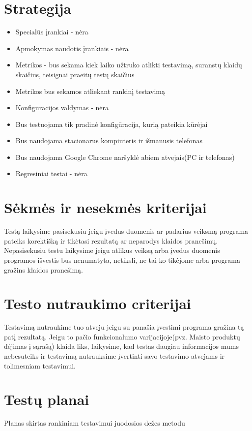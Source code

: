 \documentclass[oneside]{VUMIFPSkursinis}
\begin{document}
\section{Strategija}
	\begin{itemize}
		\item{Specialūs įrankiai - nėra}
		\item{Apmokymas naudotis įrankiais - nėra}
		\item{Metrikos - bus sekama kiek laiko užtruko atlikti testavimą, suranstų klaidų skaičius, teisignai praeitų testų skaičius}
		\item{Metrikos bus sekamos atliekant rankinį testavimą}
		\item{Konfigūracijos valdymas - nėra}
		\item{Bus testuojama tik pradinė konfigūracija, kurią pateikia kūrėjai}
		\item{Bus naudojama stacionarus kompiuteris ir išmanusis telefonas}
		\item{Bus naudojama Google Chrome naršyklė abiem atvejais(PC ir telefonas)}
		\item{Regresiniai testai - nėra}
	\end{itemize}

\section{Sėkmės ir nesekmės kriterijai}
Testą laikysime pasisekusiu jeigu įvedus duomenis ar padarius veiksmą programa pateiks korektišką ir tikėtasi rezultatą ar neparodys klaidos pranešimų. Nepasisekusiu testu laikysime jeigu atlikus veiksą arba įvedus duomenis programos išvestis bus nenumatyta, netiksli, ne tai ko tikėjome arba programa gražins klaidos pranešimą.

\section{Testo nutraukimo criterijai}
Testavimą nutraukime tuo atveju jeigu su panašia įvestimi programa gražina tą patį rezultatą. Jeigu to pačio funkcionalumo varijacijoje(pvz. Maisto produktų dėjimas į sąrašą) klaida liks, laikysime, kad testas daugiau informacijos mums nebesuteiks ir testavimą nutrauksime įvertinti savo testavimo atvejams ir tolimesniam testavimui.

\section{Testų planai}
Planas skirtas rankiniam testavimui juodosios dežes metodu
\end{document}
